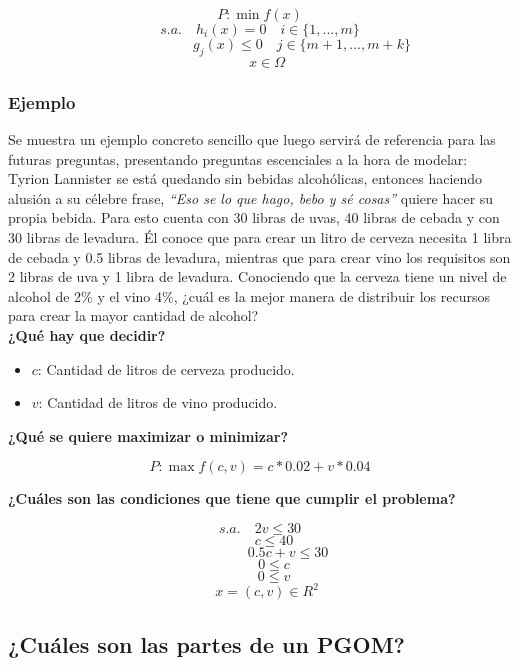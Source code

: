 \documentclass[a4paper,10pt,twocolumn]{article}
\theoremstyle{theorem}
\theoremstyle{definition}
\theoremstyle{remark}
\begin{document}
$$
P: \min f(x)
$$
$$
s.a. \quad h_i(x) = 0 \quad i \in \{1,...,m\}
$$
$$
\qquad \qquad \qquad g_j(x) \le 0 \quad j \in \{m+1,...,m+k\}
$$
$$
\quad x \in \Omega
$$

		\subsubsection{Ejemplo}\label{subsub:ejemplo}

Se muestra un ejemplo concreto sencillo que luego servirá de referencia para las futuras preguntas, presentando preguntas escenciales a la hora de modelar:\\

Tyrion Lannister se está quedando sin bebidas alcohólicas, entonces haciendo alusión a su célebre frase, \textit{“Eso se lo que hago, bebo y sé cosas”} quiere hacer su propia bebida. Para esto cuenta con 30 libras de uvas, 40 libras de cebada y con 30 libras de levadura. Él conoce que para crear un litro de cerveza necesita 1 libra de cebada y 0.5 libras de levadura, mientras que para crear vino los requisitos son 2 libras de uva y 1 libra de levadura. Conociendo que la cerveza tiene un nivel de alcohol de 2\% y el vino 4\%, ¿cuál es la mejor manera de distribuir los recursos para crear la mayor cantidad de alcohol?\\

\textbf{¿Qué hay que decidir?}

\begin{itemize}
	\item $c$: Cantidad de litros de cerveza producido.
	\item $v$: Cantidad de litros de vino producido.
\end{itemize}

\textbf{¿Qué se quiere maximizar o minimizar?}

$$
P: \max f(c, v) = c * 0.02 + v * 0.04
$$

\textbf{¿Cuáles son las condiciones que tiene que cumplir el problema?}

$$
s.a. \quad 2 v \le 30
$$
$$
\qquad c \le 40
$$
$$
\qquad \qquad 0.5 c + v \le 30 
$$
$$
\qquad 0 \le c 
$$
$$
\qquad 0 \le v 
$$
$$
\quad x = (c, v) \in R^2
$$

	\subsection{¿Cuáles son las partes de un PGOM?}\label{sub:results}
\end{document}
